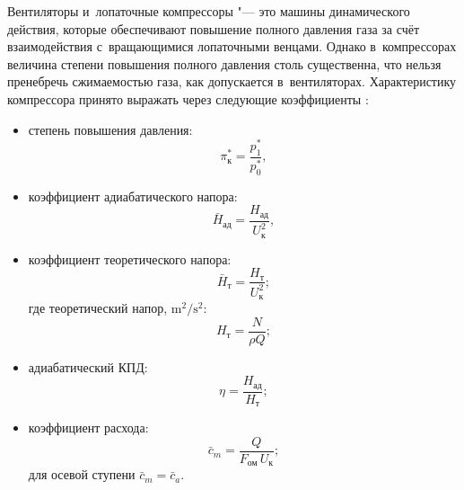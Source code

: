Вентиляторы и~лопаточные компрессоры "--- это машины динамического действия, которые обеспечивают повышение полного давления газа за счёт взаимодействия с~вращающимися лопаточными венцами.
Однако в~компрессорах величина степени повышения полного давления столь существенна, что нельзя пренебречь сжимаемостью газа, как допускается в~вентиляторах.
Характеристику компрессора принято выражать через следующие коэффициенты \autocite{Beknev1983}:
\begin{itemize}
    \item[] степень повышения давления:
    \begin{equation}
        \pi^{*}_\text{к}=\frac{p^{*}_1}{p^{*}_0},
    \end{equation}

	\item[] коэффициент адиабатического напора:
	\begin{equation}
		\bar{H}_{\text{ад}} = \frac{H_\text{ад}}{U_\text{к}^2},
	\end{equation}
	\item[] коэффициент теоретического напора:
	\begin{equation}
		\bar{H}_{\text{т}} = \frac{H_\text{т}}{U_\text{к}^2};
	\end{equation}
 где теоретический напор, \(\si\meter^2/\si\second^2\):
	\begin{equation*}
		H_\text{т} = \frac{N}{\rho Q};
	\end{equation*}

	\item[] адиабатический КПД:
	\begin{equation}
		\eta = \frac{H_\text{ад}}{H_\text{т}};
	\end{equation}

	\item[] коэффициент расхода:
	\begin{equation}
		\bar{c}_{m} = \frac{Q}{F_{\text{ом}} \, U_\text{к}};
	\end{equation}
 для осевой ступени \(\bar{c}_{m}=\bar{c}_{a}\).
\end{itemize}

